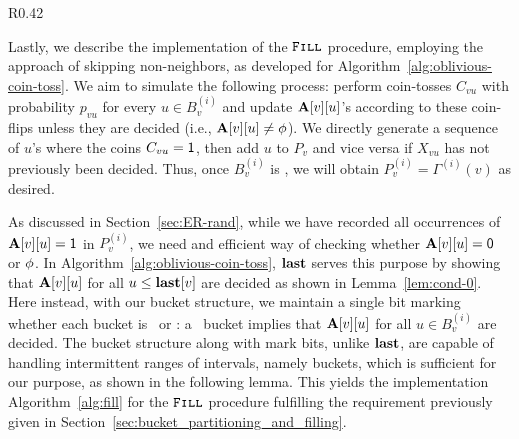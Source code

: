 \begin{wrapfigure}[13]{R}{0.42\textwidth}
\vspace{-1.5em}
\begin{framed}
    \renewcommand\figurename{Algorithm}
    \caption{Sampling in a Bucket}
    \label{alg:fill}
    \begin{algorithmic}
                \EndIf
            \EndWhile
    \EndProcedure
    \end{algorithmic}
\end{framed}
\end{wrapfigure}

Lastly, we describe the implementation of the $\texttt{\textsc{Fill}}$ procedure, employing the approach of skipping non-neighbors, as developed for Algorithm~\ref{alg:oblivious-coin-toss}. We aim to simulate the following process: perform coin-tosses $C_{vu}$ with probability $p_{vu}$ for every $u \in B^{(i)}_v$ and update $\mathbf{A}[v][u]$'s according to these coin-flips unless they are decided (i.e., $\mathbf{A}[v][u] \neq \phi$). We directly generate a sequence of $u$'s where the coins $C_{vu} = \mathsf{1}$, then add $u$ to $P_v$ and vice versa if $X_{vu}$ has not previously been decided. Thus, once $B^{(i)}_v$ is \filled, we will obtain $P_v^{(i)} = \Gamma^{(i)}(v)$ as desired.

As discussed in Section~\ref{sec:ER-rand}, while we have recorded all occurrences of $\mathbf{A}[v][u]=\mathsf{1}$ in $P_v^{(i)}$,
we need and efficient way of checking whether $\mathbf{A}[v][u] = \mathsf{0}$ or $\phi$. In Algorithm~\ref{alg:oblivious-coin-toss},
$\mathbf{last}$ serves this purpose by showing that $\mathbf{A}[v][u]$ for all $u \leq \mathbf{last}[v]$ are decided as shown in Lemma~\ref{lem:cond-0}.
Here instead, with our bucket structure, we maintain a single bit marking whether each bucket is \filled~or \unfilled:
a \filled~bucket implies that $\mathbf{A}[v][u]$ for all $u \in B^{(i)}_v$ are decided.
The bucket structure along with mark bits, unlike $\mathbf{last}$, are capable of handling intermittent ranges of intervals,
namely buckets, which is sufficient for our purpose, as shown in the following lemma.
This yields the implementation Algorithm~\ref{alg:fill} for the $\texttt{\textsc{Fill}}$ procedure
fulfilling the requirement previously given in Section~\ref{sec:bucket_partitioning_and_filling}. 

